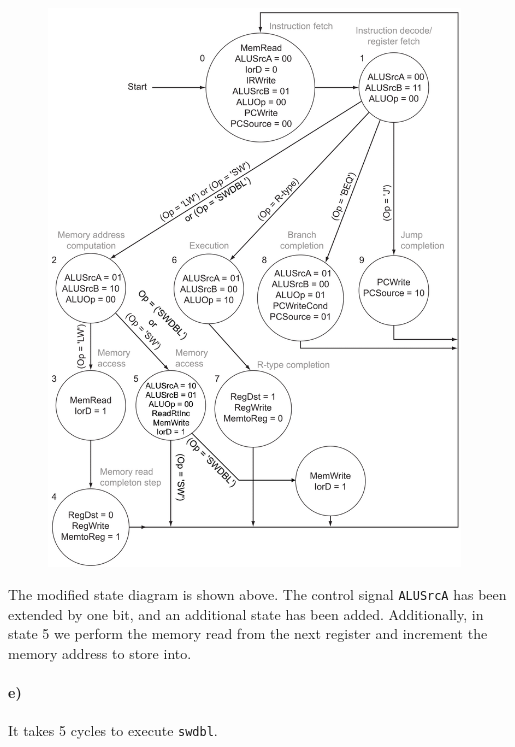 \documentclass[12pt]{article}
\begin{document}
\begin{figure}[!ht]
    \begin{center}
        \includegraphics[width=4.3in]{problem5d.png}
    \end{center}
\end{figure}

The modified state diagram is shown above. The control signal \texttt{ALUSrcA} has been extended by one bit, and an additional state has been added. Additionally,
in state 5 we perform the memory read from the next register and increment the memory address to store into.

\paragraph{e)}

It takes 5 cycles to execute \texttt{swdbl}.
\end{document}
